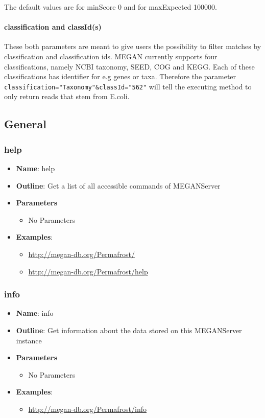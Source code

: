 \documentclass[11pt]{article}
\begin{document}
The default values are for minScore 0 and for maxExpected 100000.


\paragraph{classification and classId(s)}
\label{subsec:class}
These both parameters are meant to give users the possibility to filter matches by classification and classification ids. MEGAN currently supports four classifications, namely NCBI taxonomy, SEED, COG and KEGG. Each of these classifications has identifier for e.g genes or taxa. Therefore the parameter \texttt{classification="Taxonomy"\&classId="562"} will tell the executing method to only return reads that stem from E.coli.



\subsection{General}
\subsubsection{help}

\begin{itemize}
	\item \textbf{Name}: help
	\item \textbf{Outline}: Get a list of all accessible commands of MEGANServer
	\item \textbf{Parameters}
		\begin{itemize}
			\item No Parameters
		\end{itemize}
	\item \textbf{Examples}:
		\begin{itemize}
			\item \url{http://megan-db.org/Permafrost/}
			\item \url{http://megan-db.org/Permafrost/help}
		\end{itemize}
\end{itemize}

\subsubsection{info}

\begin{itemize}
	\item \textbf{Name}: info
	\item \textbf{Outline}: Get information about the data stored on this MEGANServer instance
	\item \textbf{Parameters}
		\begin{itemize}
			\item No Parameters
		\end{itemize}
	\item \textbf{Examples}:
		\begin{itemize}
			\item \url{http://megan-db.org/Permafrost/info}
		\end{itemize}
\end{itemize}
\end{document}
